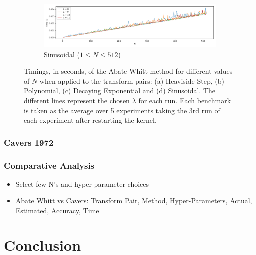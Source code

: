 \documentclass[a4paper]{report}
\begin{document}
\begin{figure}[H]
    \medskip
    
    \begin{subfigure}{1\linewidth}
      \includegraphics[width=\linewidth]{images/abate_whitt/sinusoidal_speeds.png}
      \caption{Sinusoidal ($1 \leq N \leq 512$)}
    \end{subfigure}
    
    \caption{Timings, in seconds, of the Abate-Whitt method for different values of $N$ when applied to the transform pairs: (a) Heaviside Step, (b) Polynomial, (c) Decaying Exponential and (d) Sinusoidal. The different lines represent the chosen $\lambda$ for each run. Each benchmark is taken as the average over 5 experiments taking the 3rd run of each experiment after restarting the kernel.}
    \label{fig:timings_abate_whitt}
\end{figure}

\subsection{Cavers 1972}


\subsection{Comparative Analysis}
\begin{itemize}
	\item Select few N's and hyper-parameter choices
	\item Abate Whitt vs Cavers: Transform Pair, Method, Hyper-Parameters, Actual, Estimated, Accuracy, Time	
\end{itemize}


\chapter{Conclusion}
\end{document}
